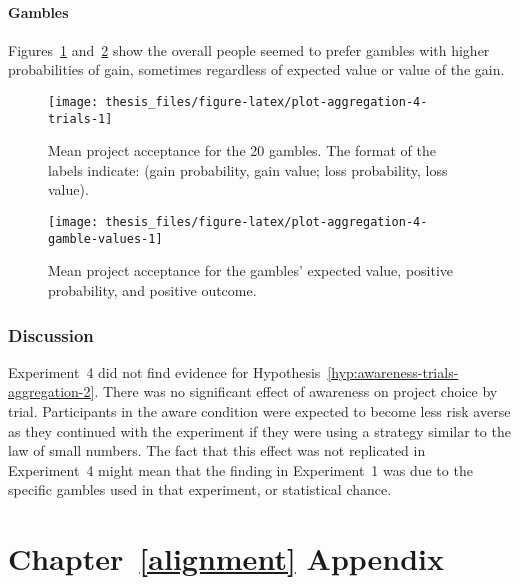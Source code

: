 \documentclass[a4paper, nobind]{templates/ociamthesis}
\theoremstyle{definition}
\theoremstyle{definition}
\theoremstyle{definition}
\theoremstyle{definition}
\theoremstyle{remark}
\begin{document}
\subsubsection{Gambles}

Figures~\ref{fig:plot-aggregation-4-trials}
and~\ref{fig:plot-aggregation-4-gamble-values} show the
overall people seemed to prefer gambles with higher probabilities of gain,
sometimes regardless of expected value or value of the gain.



\begin{figure}
\texttt{[image: thesis\_files/figure-latex/plot-aggregation-4-trials-1]} \caption{Mean project acceptance for the 20 gambles. The format of the labels indicate: (gain probability, gain value; loss probability, loss value).}\label{fig:plot-aggregation-4-trials}
\end{figure}



\begin{figure}
\texttt{[image: thesis\_files/figure-latex/plot-aggregation-4-gamble-values-1]} \caption{Mean project acceptance for the gambles' expected value, positive probability, and positive outcome.}\label{fig:plot-aggregation-4-gamble-values}
\end{figure}

\subsection{Discussion}

Experiment~4 did not find evidence for
Hypothesis~\ref{hyp:awareness-trials-aggregation-2}. There was no significant
effect of awareness on project choice by trial. Participants in the aware
condition were expected to become less risk averse as they continued with the
experiment if they were using a strategy similar to the law of small numbers.
The fact that this effect was not replicated in Experiment~4 might mean that the
finding in Experiment~1 was due to the specific gambles used in that experiment,
or statistical chance.

\hypertarget{alignment-appendix}{%
\chapter{Chapter~\ref{alignment} Appendix}\label{alignment-appendix}}

\minitoc
\end{document}
